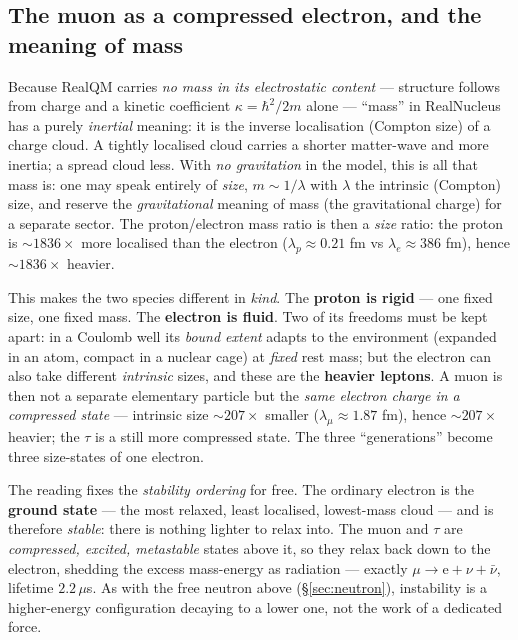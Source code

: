 \documentclass[11pt]{article}
\begin{document}
\subsection{The muon as a compressed electron, and the meaning of mass}

Because RealQM carries \emph{no mass in its electrostatic content} --- structure follows from charge and a
kinetic coefficient $\kappa=\hbar^2/2m$ alone --- ``mass'' in RealNucleus has a purely \emph{inertial}
meaning: it is the inverse localisation (Compton size) of a charge cloud. A tightly localised cloud carries a
shorter matter-wave and more inertia; a spread cloud less. With \emph{no gravitation} in the model, this is
all that mass is: one may speak entirely of \emph{size}, $m\sim 1/\lambda$ with $\lambda$ the intrinsic
(Compton) size, and reserve the \emph{gravitational} meaning of mass (the gravitational charge) for a separate
sector. The proton/electron mass ratio is then a \emph{size} ratio: the proton is ${\sim}1836\times$ more
localised than the electron ($\lambda_p\approx0.21$ fm vs $\lambda_e\approx386$ fm), hence ${\sim}1836\times$
heavier.

This makes the two species different in \emph{kind}. The \textbf{proton is rigid} --- one fixed size, one
fixed mass. The \textbf{electron is fluid}. Two of its freedoms must be kept apart: in a Coulomb well its
\emph{bound extent} adapts to the environment (expanded in an atom, compact in a nuclear cage) at
\emph{fixed} rest mass; but the electron can also take different \emph{intrinsic} sizes, and these are the
\textbf{heavier leptons}. A muon is then not a separate elementary particle but the \emph{same electron charge
in a compressed state} --- intrinsic size ${\sim}207\times$ smaller ($\lambda_\mu\approx1.87$ fm), hence
${\sim}207\times$ heavier; the $\tau$ is a still more compressed state. The three ``generations'' become three
size-states of one electron.

The reading fixes the \emph{stability ordering} for free. The ordinary electron is the \textbf{ground state}
--- the most relaxed, least localised, lowest-mass cloud --- and is therefore \emph{stable}: there is nothing
lighter to relax into. The muon and $\tau$ are \emph{compressed, excited, metastable} states above it, so they
relax back down to the electron, shedding the excess mass-energy as radiation --- exactly
$\mu\to\mathrm{e}+\nu+\bar\nu$, lifetime $2.2\,\mu$s. As with the free neutron above (\S\ref{sec:neutron}),
instability is a higher-energy configuration decaying to a lower one, not the work of a dedicated force.
\end{document}
